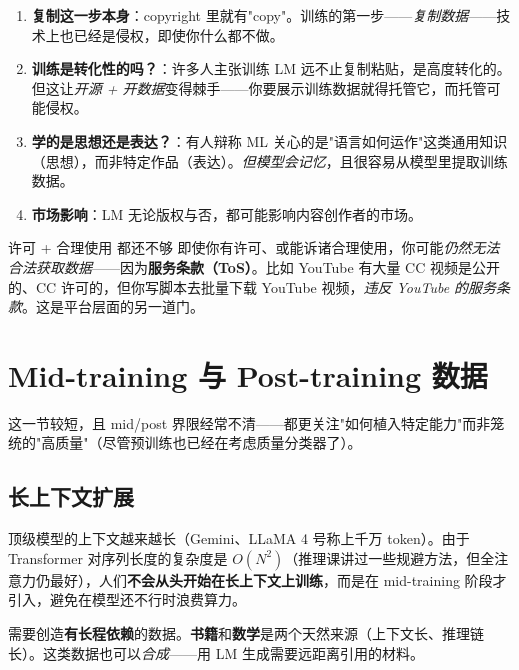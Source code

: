 \documentclass[a4paper]{article}
\begin{document}
\begin{tcolorbox}[enhanced, colback=red!5!white, colframe=red!75!black, sharp corners, title=\textbf{训练 vs. 版权：四个争论点}]
\begin{enumerate}
\item \textbf{复制这一步本身}：copyright 里就有"copy"。训练的第一步——\emph{复制数据}——技术上也已经是侵权，即使你什么都不做。
\item \textbf{训练是转化性的吗？}：许多人主张训练 LM 远不止复制粘贴，是高度转化的。但这让\emph{开源 + 开数据}变得棘手——你要展示训练数据就得托管它，而托管可能侵权。
\item \textbf{学的是思想还是表达？}：有人辩称 ML 关心的是"语言如何运作"这类通用知识（思想），而非特定作品（表达）。\emph{但模型会记忆}，且很容易从模型里提取训练数据。
\item \textbf{市场影响}：LM 无论版权与否，都可能影响内容创作者的市场。
\end{enumerate}
\end{tcolorbox}

\begin{warningbox}{许可 + 合理使用 都还不够}
即使你有许可、或能诉诸合理使用，你可能\emph{仍然无法合法获取数据}——因为\textbf{服务条款（ToS）}。比如 YouTube 有大量 CC 视频是公开的、CC 许可的，但你写脚本去批量下载 YouTube 视频，\emph{违反 YouTube 的服务条款}。这是平台层面的另一道门。
\end{warningbox}

\section{Mid-training 与 Post-training 数据}

这一节较短，且 mid/post 界限经常不清——都更关注"如何植入特定能力"而非笼统的"高质量"（尽管预训练也已经在考虑质量分类器了）。

\subsection{长上下文扩展}

顶级模型的上下文越来越长（Gemini、LLaMA 4 号称上千万 token）。由于 Transformer 对序列长度的复杂度是 \textbf{$O(N^2)$}（推理课讲过一些规避方法，但全注意力仍最好），人们\textbf{不会从头开始在长上下文上训练}，而是在 mid-training 阶段才引入，避免在模型还不行时浪费算力。

\begin{tcolorbox}[enhanced, colback=blue!5!white, colframe=blue!75!black, sharp corners, title=\textbf{长上下文的数据来源}]
需要创造\textbf{有长程依赖}的数据。\textbf{书籍}和\textbf{数学}是两个天然来源（上下文长、推理链长）。这类数据也可以\emph{合成}——用 LM 生成需要远距离引用的材料。
\end{tcolorbox}
\end{document}
